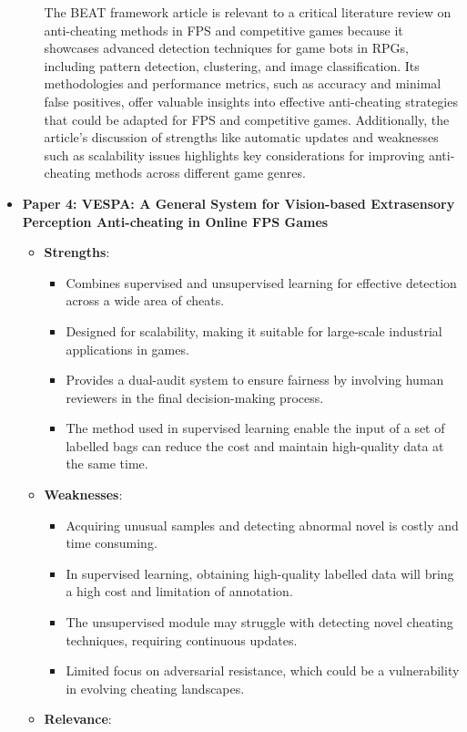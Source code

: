 \documentclass[a4paper, 12pt]{article}
\begin{document}
\begin{itemize}
\begin{itemize}
        The BEAT framework article is relevant to a critical literature review on anti-cheating methods in FPS and competitive games because it showcases advanced detection techniques for game bots in RPGs, including pattern detection, clustering, and image classification. Its methodologies and performance metrics, such as accuracy and minimal false positives, offer valuable insights into effective anti-cheating strategies that could be adapted for FPS and competitive games. Additionally, the article’s discussion of strengths like automatic updates and weaknesses such as scalability issues highlights key considerations for improving anti-cheating methods across different game genres.
    \end{itemize}
    \item \textbf{Paper 4: VESPA: A General System for Vision-based Extrasensory Perception Anti-cheating in Online FPS Games}
    \begin{itemize}
        \item \textbf{Strengths}: 
        \begin{itemize}
            \item Combines supervised and unsupervised learning for effective detection across a wide area of cheats.
            \item Designed for scalability, making it suitable for large-scale industrial applications in games.
            \item Provides a dual-audit system to ensure fairness by involving human reviewers in the final decision-making process.
            \item The method used in supervised learning enable the input of a set of labelled bags can reduce the cost and maintain high-quality data at the same time.
        \end{itemize}
        \item \textbf{Weaknesses}: 
        \begin{itemize}
            \item Acquiring unusual samples and detecting abnormal novel is costly and time consuming.
            \item In supervised learning, obtaining high-quality labelled data will bring a high cost and limitation of annotation.
            \item The unsupervised module may struggle with detecting novel cheating techniques, requiring continuous updates.
            \item Limited focus on adversarial resistance, which could be a vulnerability in evolving cheating landscapes.
        \end{itemize}
        \item \textbf{Relevance}:
        

\end{itemize}
\end{itemize}
\end{document}
